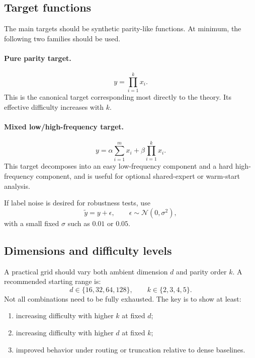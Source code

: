 \documentclass[11pt]{article}
\begin{document}
\subsection{Target functions}

The main targets should be synthetic parity-like functions. At minimum, the following two families should be used.

\paragraph{Pure parity target.}
\begin{equation}
    y = \prod_{i=1}^{k} x_i.
\end{equation}
This is the canonical target corresponding most directly to the theory. Its effective difficulty increases with $k$.

\paragraph{Mixed low/high-frequency target.}
\begin{equation}
    y = \alpha \sum_{i=1}^{m} x_i + \beta \prod_{i=1}^{k} x_i.
\end{equation}
This target decomposes into an easy low-frequency component and a hard high-frequency component, and is useful for optional shared-expert or warm-start analysis.

If label noise is desired for robustness tests, use
\begin{equation}
    \tilde{y} = y + \epsilon, \qquad \epsilon \sim \mathcal{N}(0,\sigma^2),
\end{equation}
with a small fixed $\sigma$ such as $0.01$ or $0.05$.

\subsection{Dimensions and difficulty levels}

A practical grid should vary both ambient dimension $d$ and parity order $k$. A recommended starting range is:
\begin{equation}
    d \in \{16, 32, 64, 128\}, \qquad k \in \{2, 3, 4, 5\}.
\end{equation}
Not all combinations need to be fully exhausted. The key is to show at least:
\begin{enumerate}[leftmargin=2em]
    \item increasing difficulty with higher $k$ at fixed $d$;
    \item increasing difficulty with higher $d$ at fixed $k$;
    \item improved behavior under routing or truncation relative to dense baselines.
\end{enumerate}
\end{document}
